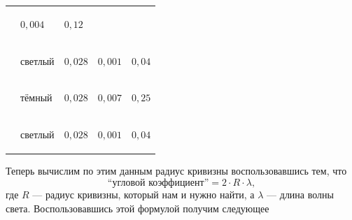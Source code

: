 \documentclass[12pt]{article}
\begin{document}
\begin{tabular}{|p{}|p{}|p{}|p{}|p{}|}
		& \begin{center}
			$\displaystyle 0,004$
		\end{center}
		& \begin{center}
			$\displaystyle 0,12$
		\end{center}
		\\
		\cline{2-5} 
		& \begin{center}
			светлый
		\end{center}
		& \begin{center}
			$\displaystyle 0,028$
		\end{center}
		& \begin{center}
			$\displaystyle 0,001$
		\end{center}
		& \begin{center}
			$\displaystyle 0,04$
		\end{center}
		\\
		\hline 
		\begin{center}\multirow{2}{*}{синий
			}\end{center} & \begin{center}
			тёмный
		\end{center}
		& \begin{center}
			$\displaystyle 0,028$
		\end{center}
		& \begin{center}
			$\displaystyle 0,007$
		\end{center}
		& \begin{center}
			$\displaystyle 0,25$
		\end{center}
		\\
		\cline{2-5} 
		& \begin{center}
			светлый
		\end{center}
		& \begin{center}
			$\displaystyle 0,028$
		\end{center}
		& \begin{center}
			$\displaystyle 0,001$
		\end{center}
		& \begin{center}
			$\displaystyle 0,04$
		\end{center}
		\\
		\hline
	\end{tabular}
	
	Теперь вычислим по этим данным радиус кривизны воспользовавшись тем, что 
	\begin{equation*}
		\text{``угловой коэффициент''}=2\cdot R\cdot \lambda,
	\end{equation*}
	где $R$ --- радиус кривизны, который нам и нужно найти, а $\lambda$ --- длина волны света. Воспользовавшись этой формулой получим следующее
	
\end{document}
